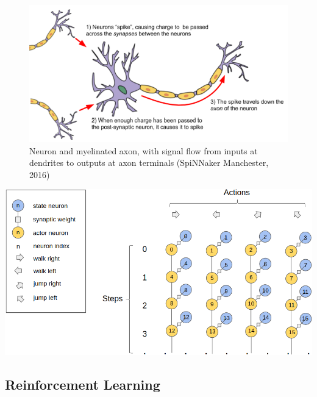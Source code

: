 \documentclass[10pt]{article}
\begin{document}
    \begin{figure}[b]
    \center
    \includegraphics[width=140mm]{./neurons.png}
    \caption{Neuron and myelinated axon, with signal flow from inputs at dendrites to outputs at axon terminals (SpiNNaker Manchester, 2016)}
    \label{fig:neurons}
    \end{figure}

    \setcounter{suppfigure}{4}

    \begin{suppfigure*}[b]
    \center
    \includegraphics[width=147mm]{./neuronsWideLegend.png}
    \caption{Diagram showing how the synaptic weights between the state neurons and the actor neurons encode the policy of the agent.}
    \label{fig:stateActor}
    \end{suppfigure*}

    \subsection{Reinforcement Learning}
\end{document}
